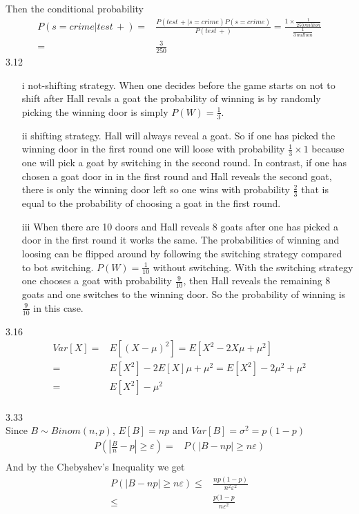 \documentclass[letterpaper,12pt]{article}
\theoremstyle{definition}
\begin{document}
\begin{enumerate}
\begin{itemize}
\end{itemize}
Then the conditional probability 
\begin{align*}
P(s=crime|test\, +)=&\frac{P(test\, +|s=crime)P(s=crime)}{P(test\, +)}=\frac{1\times\frac{1}{250\, million}}{\frac{1}{3 \, million}} \\
=&\frac{3}{250}
\end{align*}
3.12 \\
\begin{itemize}
\item[i] not-shifting strategy. When one decides before the game starts on not to shift after Hall revals a goat the probability of winning is by randomly picking the winning door is simply $P(W) = \frac{1}{3}$.
\item[ii] shifting strategy. Hall will always reveal a goat. So if one has picked the winning door in the first round one will loose  with probability $\frac{1}{3}\times 1$ because one will pick a goat by switching in the second round. In contrast, if one has chosen a goat door in in the first round and Hall reveals the second goat, there is only the winning door left so one wins with probability $\frac{2}{3}$  that is equal to the probability of choosing a goat in the first round.
\item[iii] When there are 10 doors and Hall reveals 8 goats after one has picked a door in the first round it works the same. The probabilities of winning and loosing can be flipped around by following the switching strategy compared to  bot switching. $P(W)=\frac{1}{10}$ without switching. With the switching strategy one chooses a goat with probability $\frac{9}{10}$, then Hall reveals the remaining $8$ goats and one switches to the winning door. So  the probability of winning is $\frac{9}{10}$ in this case.
\end{itemize}

3.16\\
\begin{align*}
Var[X] =& E\left[ (X-\mu)^2 \right] = E\left[ X^2 - 2 X \mu + \mu^2 \right] \\
=& E[X^2] - 2E[X]\mu +\mu^2 =  E[X^2] - 2\mu^2 +\mu^2 \\
=&  E[X^2] - \mu^2 
\end{align*}\\
3.33\\

Since $B \sim Binom(n, p)$, $E[B]=np$ and $Var[B]= \sigma^2 = p(1-p)$
\begin{align*}
P\left(|\frac{B}{n}-p| \geq \varepsilon \right) =& P \left( |B-np|  \geq n \varepsilon \right) \\
\end{align*}
And by the Chebyshev's Inequality we get
\begin{align*}
P \left( |B-np|  \geq n \varepsilon \right) \leq& \frac{np(1-p)}{n^2 \varepsilon^2} \\
\leq& \frac{p(1-p}{n \varepsilon^2}
\end{align*}\\


\end{enumerate}
\end{document}
